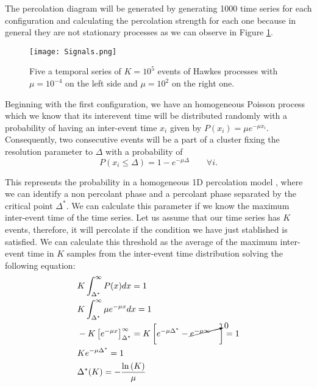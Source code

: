 The percolation diagram will be generated by generating 1000 time series for each configuration and calculating the percolation strength for each one because in general they are not stationary
processes as we can observe in Figure \ref{f: Hawkes not stationary}.

\begin{figure}[H]
    \centering
    \texttt{[image: Signals.png]}
    \caption{Five a temporal series of $K=10^5$ events of Hawkes processes with $\mu=10^{-4}$ on the left side and $\mu = 10^2$ on the right one.}
    \label{f: Hawkes not stationary}
\end{figure}

Beginning with the first configuration, we have an homogeneous Poisson process which we know that its interevent time will be distributed randomly with a probability of having an inter-event
time $x_i$ given by $P(x_i)=\mu e^{-\mu x_i}$. Consequently, two consecutive events will be a part of a cluster fixing the resolution parameter to $\Delta$ with a probability of
\begin{equation}
    P(x_i\leq \Delta)=1-e^{-\mu\Delta}\quad\quad \forall i.
    \label{eq: Poisson prob of cluster of size 2}
\end{equation}

This represents the probability in a homogeneous 1D percolation model \cite{stauffer2018introduction}, where we can identify a non percolant phase and a percolant phase separated by the
critical point $\Delta^*$. We can calculate this parameter if we know the maximum inter-event time of the time series. Let us assume that our time series has $K$ events, therefore, it will 
percolate if the condition we have just stablished is satisfied. We can calculate this threshold as the average of the maximum inter-event time in $K$ samples from the 
inter-event time distribution solving the following equation:
\begin{equation}
    \begin{split}
        &K\int_{\Delta^*}^{\infty}P(x) dx=1\\
        &K\int_{\Delta^*}^{\infty}\mu e^{-\mu x}dx=1\\
        &-K\left[ e^{-\mu x} \right]_{\Delta^*}^{\infty}=K\left[ e^{-\mu\Delta^*} - \cancelto{0}{e^{-\mu\infty}\quad} \right]=1\\
        &K e^{-\mu\Delta^*}=1\\
        &\Delta^*(K)=-\dfrac{\ln\left(K \right)}{\mu}
    \end{split}
    \label{eq: critical point}
\end{equation}

